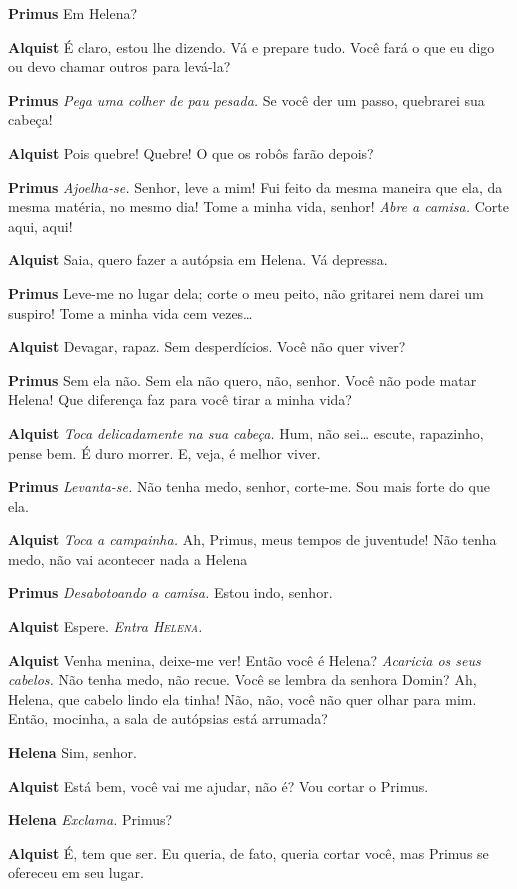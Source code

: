 \textbf{Primus} Em Helena?

\textbf{Alquist} É claro, estou lhe dizendo. Vá e prepare tudo. Você 
fará o que eu digo ou devo chamar outros para levá-la?

\textbf{Primus} \emph{Pega uma colher de pau pesada.} Se você der um passo, quebrarei sua
cabeça!

\textbf{Alquist} Pois quebre! Quebre! O que os robôs farão depois?

\textbf{Primus} \emph{Ajoelha-se.} Senhor, leve a mim! Fui feito da mesma
maneira que ela, da mesma matéria, no mesmo dia! Tome a minha vida, senhor!
\emph{Abre a camisa.} Corte aqui, aqui!

\textbf{Alquist} Saia, quero fazer a autópsia em Helena. Vá depressa.

\textbf{Primus} Leve-me no lugar dela; corte o meu peito, não gritarei nem
darei um suspiro! Tome a minha vida cem vezes\ldots{}

\textbf{Alquist} Devagar, rapaz. Sem desperdícios. Você não quer viver?

\textbf{Primus} Sem ela não. Sem ela não quero, não, senhor. Você não pode matar 
Helena! Que diferença faz para você tirar a minha vida?

\textbf{Alquist} \emph{Toca delicadamente na sua cabeça.} Hum, não sei\ldots{} escute,
rapazinho, pense bem. É duro morrer. E, veja, é melhor viver.

\textbf{Primus} \emph{Levanta-se.} Não tenha medo, senhor, corte-me. Sou mais forte
do que ela.

\textbf{Alquist} \emph{Toca a campainha.} Ah, Primus, meus tempos de juventude! 
Não tenha medo, não vai acontecer nada a Helena

\textbf{Primus} \emph{Desabotoando a camisa.} Estou indo, senhor.

\textbf{Alquist} Espere.
\emph{Entra \textsc{Helena}.}

\textbf{Alquist} Venha menina, deixe-me ver! Então você é Helena? \emph{Acaricia os
seus cabelos.} Não tenha medo, não recue. Você se lembra da senhora Domin? Ah,
Helena, que cabelo lindo ela tinha! Não, não, você não quer olhar para mim.
Então, mocinha, a sala de autópsias está arrumada?

\textbf{Helena} Sim, senhor.

\textbf{Alquist} Está bem, você vai me ajudar, não é? Vou cortar o Primus.

\textbf{Helena} \emph{Exclama.} Primus?

\textbf{Alquist} É, tem que ser. Eu queria, de fato, queria cortar
você, mas Primus se ofereceu em seu lugar.

